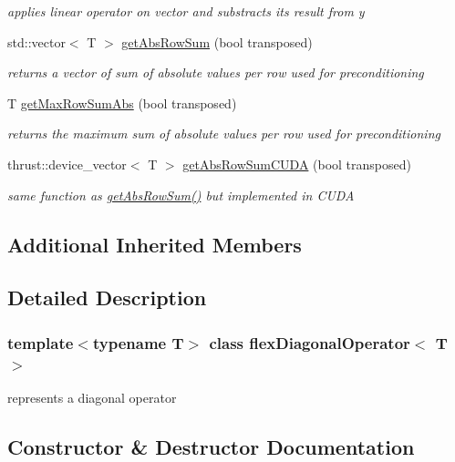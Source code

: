 \begin{DoxyCompactItemize}
\begin{DoxyCompactList}\small\item\em applies linear operator on vector and substracts its result from y \end{DoxyCompactList}\item 
std\+::vector$<$ T $>$ \hyperlink{classflex_diagonal_operator_ad53cb526b55141a1d0519a023572cf58}{get\+Abs\+Row\+Sum} (bool transposed)
\begin{DoxyCompactList}\small\item\em returns a vector of sum of absolute values per row used for preconditioning \end{DoxyCompactList}\item 
T \hyperlink{classflex_diagonal_operator_aa9c144ae23fbcbcdcd14cc779182896a}{get\+Max\+Row\+Sum\+Abs} (bool transposed)
\begin{DoxyCompactList}\small\item\em returns the maximum sum of absolute values per row used for preconditioning \end{DoxyCompactList}\item 
thrust\+::device\+\_\+vector$<$ T $>$ \hyperlink{classflex_diagonal_operator_a71cdb6ea6b8b7ceabaf538a180c8dcf4}{get\+Abs\+Row\+Sum\+C\+U\+DA} (bool transposed)
\begin{DoxyCompactList}\small\item\em same function as \hyperlink{classflex_diagonal_operator_ad53cb526b55141a1d0519a023572cf58}{get\+Abs\+Row\+Sum()} but implemented in C\+U\+DA \end{DoxyCompactList}\end{DoxyCompactItemize}
\subsection*{Additional Inherited Members}


\subsection{Detailed Description}
\subsubsection*{template$<$typename T$>$\newline
class flex\+Diagonal\+Operator$<$ T $>$}

represents a diagonal operator 

\subsection{Constructor \& Destructor Documentation}
\mbox{\label{classflex_diagonal_operator_affc1bfd1944ccf07c179ae3d4855f7af}} 
